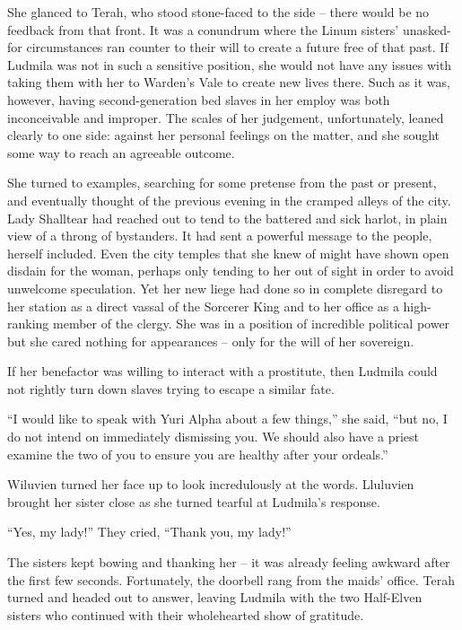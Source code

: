  

She glanced to Terah, who stood stone-faced to the side – there would be no feedback from that front. It was a conundrum where the Linum sisters’ unasked-for circumstances ran counter to their will to create a future free of that past. If Ludmila was not in such a sensitive position, she would not have any issues with taking them with her to Warden’s Vale to create new lives there. Such as it was, however, having second-generation bed slaves in her employ was both inconceivable and improper. The scales of her judgement, unfortunately, leaned clearly to one side: against her personal feelings on the matter, and she sought some way to reach an agreeable outcome.

 

She turned to examples, searching for some pretense from the past or present, and eventually thought of the previous evening in the cramped alleys of the city. Lady Shalltear had reached out to tend to the battered and sick harlot, in plain view of a throng of bystanders. It had sent a powerful message to the people, herself included. Even the city temples that she knew of might have shown open disdain for the woman, perhaps only tending to her out of sight in order to avoid unwelcome speculation. Yet her new liege had done so in complete disregard to her station as a direct vassal of the Sorcerer King and to her office as a high-ranking member of the clergy. She was in a position of incredible political power but she cared nothing for appearances – only for the will of her sovereign.

 

If her benefactor was willing to interact with a prostitute, then Ludmila could not rightly turn down slaves trying to escape a similar fate.

 

“I would like to speak with Yuri Alpha about a few things,” she said, “but no, I do not intend on immediately dismissing you. We should also have a priest examine the two of you to ensure you are healthy after your ordeals.”

 

Wiluvien turned her face up to look incredulously at the words. Lluluvien brought her sister close as she turned tearful at Ludmila’s response.

 

“Yes, my lady!” They cried, “Thank you, my lady!”

 

The sisters kept bowing and thanking her – it was already feeling awkward after the first few seconds. Fortunately, the doorbell rang from the maids’ office. Terah turned and headed out to answer, leaving Ludmila with the two Half-Elven sisters who continued with their wholehearted show of gratitude.

